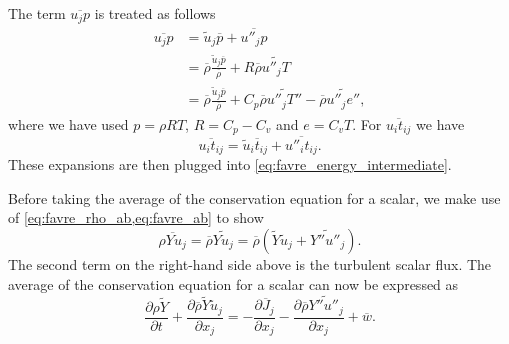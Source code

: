 \documentclass[oneside,a4paper,11pt]{report}
\newcommand{\rhoavg}{\overline{\rho}}
\newcommand{\pavg}{\overline{p}}
\newcommand{\tavg}{\overline{t}}
\newcommand{\wavg}{\overline{w}}
\newcommand{\Javg}{\overline{J}}
\newcommand{\uavgf}{\widetilde{u}}
\newcommand{\Yavgf}{\widetilde{Y}}
\newcommand{\eflucf}{e''}
\newcommand{\Yflucf}{Y''}
\newcommand{\Tflucf}{T''}
\newcommand{\uflucf}{u''}
\begin{document}
The term $\overline{u_j p}$ is treated as follows
\begin{align}
\overline{ u_j p } &= \uavgf_j \pavg  + \overline{ \uflucf_j p } \nonumber \\ 
&= \rhoavg \frac { \uavgf_j \pavg}{\rhoavg} + R \rhoavg \widetilde{ \uflucf_j T } \nonumber \\
&= \rhoavg \frac{ \uavgf_j \pavg }{\rhoavg} + C_p \rhoavg \widetilde{ \uflucf_j \Tflucf } - \rhoavg \widetilde{ \uflucf_j \eflucf } \label{eq:puj_expansion} ,
\end{align}
where we have used $p = \rho R T$, $R = C_p - C_v$ and $e = C_v T$. For $\overline{ u_i t_{ij} }$ we have
\begin{equation}
\label{eq:tuj_expansion}
\overline{ u_i t_{ij} } = \uavgf_i \tavg_{ij} + \overline{ \uflucf_i t_{ij} }. 
\end{equation}
These expansions are then plugged into \cref{eq:favre_energy_intermediate}. 

Before taking the average of the conservation equation for a scalar, we make use of \cref{eq:favre_rho_ab,eq:favre_ab} to show
\begin{equation}
\label{eq:scalar_flux_expansion}
    \overline{ \rho Y u_j } = \rhoavg \widetilde{Y u_j} = \rhoavg \left ( \Yavgf \uavgf_j + \widetilde{\Yflucf \uflucf_j} \right).
\end{equation}
The second term on the right-hand side above is the turbulent scalar flux. The average of the conservation equation for a scalar can now be expressed as
\begin{equation}
    \frac{\partial \rho \Yavgf}{\partial t} + \frac{\partial \rhoavg \Yavgf \uavgf_j}{\partial x_j} = -\frac{ \partial \Javg_j }{ \partial x_j } - \frac{ \partial \rhoavg \widetilde{\Yflucf \uflucf_j} }{ \partial x_j } + \wavg.
\end{equation}
\end{document}
